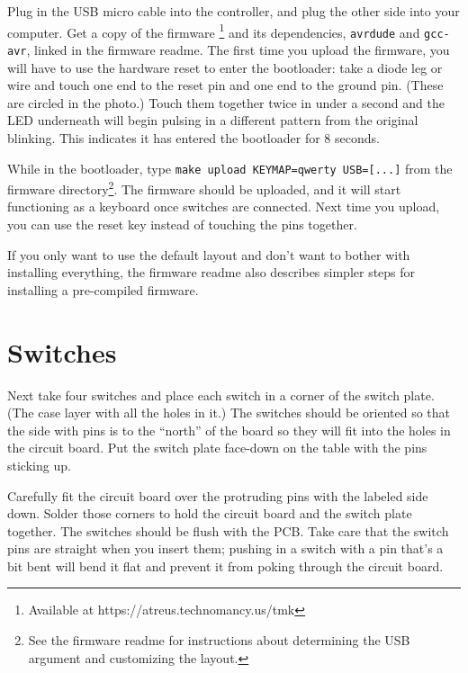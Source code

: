 \documentclass{article}
\begin{document}
Plug in the USB micro cable into the controller, and plug the other
side into your computer. Get a copy of the
firmware \footnote{Available at https://atreus.technomancy.us/tmk} and
its dependencies, \texttt{avrdude} and \texttt{gcc-avr}, linked in the
firmware readme. The first time you upload the firmware, you will have
to use the hardware reset to enter the bootloader: take a diode leg or
wire and touch one end to the reset pin and one end to the ground
pin. (These are circled in the photo.)  Touch them together twice in
under a second and the LED underneath will begin pulsing in a
different pattern from the original blinking. This indicates it has
entered the bootloader for 8 seconds.

\vspace{1em}

While in the bootloader, type \texttt{make upload KEYMAP=qwerty
  USB=[...]}  from the firmware directory\footnote{See the firmware
  readme for instructions about determining the USB argument and
  customizing the layout.}. The firmware should be uploaded, and it
will start functioning as a keyboard once switches are connected. Next
time you upload, you can use the reset key instead of touching the
pins together.

\vspace{1em}

If you only want to use the default layout and don't want to bother
with installing everything, the firmware readme also describes simpler
steps for installing a pre-compiled firmware.

\section{Switches}

Next take four switches and place each switch in a corner of the
switch plate. (The case layer with all the holes in it.) The switches
should be oriented so that the side with pins is to the ``north'' of
the board so they will fit into the holes in the circuit board. Put
the switch plate face-down on the table with the pins sticking
up.

\vspace{1em}

Carefully fit the circuit board over the protruding pins with the
labeled side down. Solder those corners to hold the circuit board and
the switch plate together. The switches should be flush with the
PCB. Take care that the switch pins are straight when you insert them;
pushing in a switch with a pin that's a bit bent will bend it flat and
prevent it from poking through the circuit board.
\end{document}
